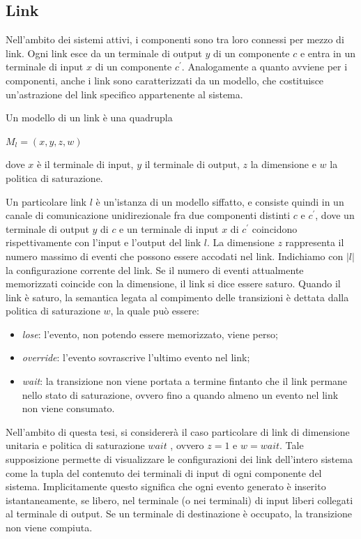 \subsection{Link}
Nell'ambito dei sistemi attivi, i componenti sono tra loro connessi per mezzo di link. Ogni link esce da un terminale di output $y$ di un componente $c$ e entra in un terminale di input $x$ di un componente $c^\prime$.
Analogamente a quanto avviene per i componenti, anche i link sono caratterizzati da un modello, che costituisce un'astrazione del link specifico appartenente al sistema.

\begin{defn}
Un modello di un link è una quadrupla
\begin{center}
	$M_l = (x,y,z,w)$
\end{center}
dove $x$ è il terminale di input, $y$ il terminale di output, $z$ la dimensione e $w$ la politica di saturazione.
\end{defn}
Un particolare link $l$ è un'istanza di un modello siffatto, e consiste quindi in un canale di comunicazione unidirezionale fra due componenti distinti $c$ e $c^\prime$, dove un terminale di output $y$ di $c$ e un terminale di input $x$ di $c^\prime$ coincidono rispettivamente con l'input e l'output del link $l$.
La dimensione $z$ rappresenta il numero massimo di eventi che possono essere accodati nel link. 
Indichiamo con $|l|$ la configurazione corrente del link. 
Se il numero di eventi attualmente memorizzati coincide con la dimensione, il link si dice essere saturo.
Quando il link è saturo, la semantica legata al compimento delle transizioni è dettata dalla politica di saturazione $w$, la quale può essere:
\begin{itemize}
\item \emph{lose}: l'evento, non potendo essere memorizzato, viene perso;
\item \emph{override}: l'evento sovrascrive l'ultimo evento nel link;
\item \emph{wait}: la transizione non viene portata a termine fintanto che il link permane nello stato di saturazione, ovvero fino a quando almeno un evento nel link non viene consumato.
\label{saturation}
\end{itemize}
Nell'ambito di questa tesi, si considererà il caso particolare di link di dimensione unitaria e politica di saturazione $wait$ , ovvero $z = 1$ e $w = wait$.
Tale supposizione permette di visualizzare le configurazioni dei link dell'intero sistema come la tupla del contenuto dei terminali di input di ogni componente del sistema. Implicitamente questo significa che ogni evento generato è inserito istantaneamente, se libero, nel terminale (o nei terminali) di input liberi collegati al terminale di output. Se un terminale di destinazione è occupato, la transizione non viene compiuta.


